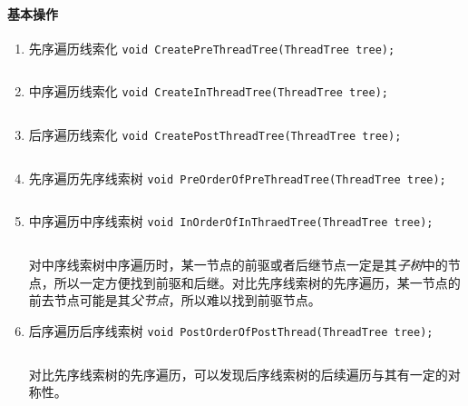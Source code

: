 \documentclass{ctexart}
\begin{document}
\paragraph{基本操作}
\begin{enumerate}
    \item 先序遍历线索化 \texttt{void CreatePreThreadTree(ThreadTree tree);}
        \inputminted{c}{codes/create-preorder-thread-tree.c}

    \item 中序遍历线索化 \texttt{void CreateInThreadTree(ThreadTree tree);}
        \inputminted{c}{codes/create-inorder-thread-tree.c}

    \item 后序遍历线索化 \texttt{void CreatePostThreadTree(ThreadTree tree);}
        \inputminted{c}{codes/create-postorder-thread-tree.c}

    \item 先序遍历先序线索树 \texttt{void PreOrderOfPreThreadTree(ThreadTree tree);}
        \inputminted{c}{codes/preorder-of-prethread-tree.c}

    \item 中序遍历中序线索树 \texttt{void InOrderOfInThraedTree(ThreadTree tree);}
        \inputminted{c}{codes/inorder-of-inthread-tree.c}
        对中序线索树中序遍历时，某一节点的前驱或者后继节点一定是其\emph{子树}中的节点，所以一定方便找到前驱和后继。对比先序线索树的先序遍历，某一节点的前去节点可能是其\emph{父节点}，所以难以找到前驱节点。

    \item 后序遍历后序线索树 \texttt{void PostOrderOfPostThread(ThreadTree tree);}
        \inputminted{c}{codes/postorder-of-postthread-tree.c}
        对比先序线索树的先序遍历，可以发现后序线索树的后续遍历与其有一定的对称性。
\end{enumerate}
\end{document}
